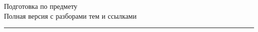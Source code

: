 \documentclass[11pt,a4paper]{article}
\newcommand{\topicsBase}{topics}
\begin{document}
\begin{center}
  {\Huge Подготовка по предмету}\\[0.4cm]
  {\large Полная версия с разборами тем и ссылками}\\[0.2cm]
  \rule{\textwidth}{0.6pt}
\end{center}


% 
% 
% 
% 
% 
\end{document}
